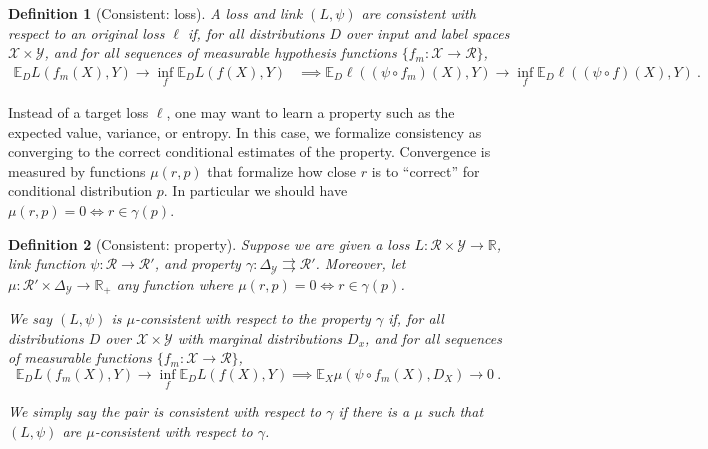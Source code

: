 \documentclass{article}
\newcommand{\Comments}{1}
\newcommand{\mytodo}[2]{\ifnum\Comments=1%
	\todo[linecolor=#1!80!black,backgroundcolor=#1,bordercolor=#1!80!black]{#2}\fi}
\newcommand{\raft}[1]{\mytodo{green!20!white}{RF: #1}}
\newcommand{\botodo}[1]{\mytodo{blue!20!white}{[Bo: #1]}}
\newcommand{\reals}{\mathbb{R}}
\newcommand{\simplex}{\Delta_\Y}
\newcommand{\propdis}{\mu}
\newcommand{\E}{\mathbb{E}}
\newcommand{\R}{\mathcal{R}}
\newcommand{\X}{\mathcal{X}}
\newcommand{\Y}{\mathcal{Y}}
\newcommand{\toto}{\rightrightarrows}
\newtheorem{definition}{Definition}
\begin{document}
\begin{definition}[Consistent: loss]\label{def:consistent-ell}
	A loss and link $(L,\psi)$ are consistent with respect to an original loss $\ell$ if, for all distributions $D$ over input and label spaces $\X \times\Y$, and for all sequences of measurable hypothesis functions $\{f_m : \X \to \R\}$,
	\begin{align*}
	\E_D L(f_m(X), Y) \to \inf_f \E_D L(f(X), Y) &\implies \E_D \ell((\psi \circ f_m)(X), Y) \to \inf_f \E_D \ell((\psi \circ f)(X), Y)~.~
	\end{align*}
\end{definition}

Instead of a target loss $\ell$, one may want to learn a property such as the expected value, variance, or entropy.
In this case, we formalize consistency as converging to the correct conditional estimates of the property.
Convergence is measured by functions $\propdis(r, p)$ that formalize how close $r$ is to ``correct'' for conditional distribution $p$.
In particular we should have $\propdis(r,p) = 0 \iff r \in \gamma(p)$.

\begin{definition}[Consistent: property]\label{def:consistent-prop}
	Suppose we are given a loss $L : \R \times \Y \to \reals$, link function $\psi: \R \to \R'$, and property $\gamma:\simplex \toto \R'$.
	Moreover, let $\propdis : \R' \times \simplex \to \reals_+$ any function where $\propdis(r,p) = 0 \iff r \in \gamma(p)$.
	
	We say $(L, \psi)$ is \emph{$\mu$-consistent with respect to the property} $\gamma$ if, for all distributions $D$ over $\X \times \Y$ with marginal distributions $D_x$, and for all sequences of measurable functions $\{f_m: \X \to \R\}$, 
	\begin{equation}
	\E_{D} L(f_m(X), Y) \to \inf_f \E_{D} L( f(X), Y) \implies \E_X \propdis(\psi \circ f_m(X), D_X) \to 0~.~
	\end{equation}
	
	We simply say the pair is consistent with respect to $\gamma$ if there is a $\propdis$ such that $(L,\psi)$ are $\propdis$-consistent with respect to $\gamma$.
\end{definition}
\end{document}
